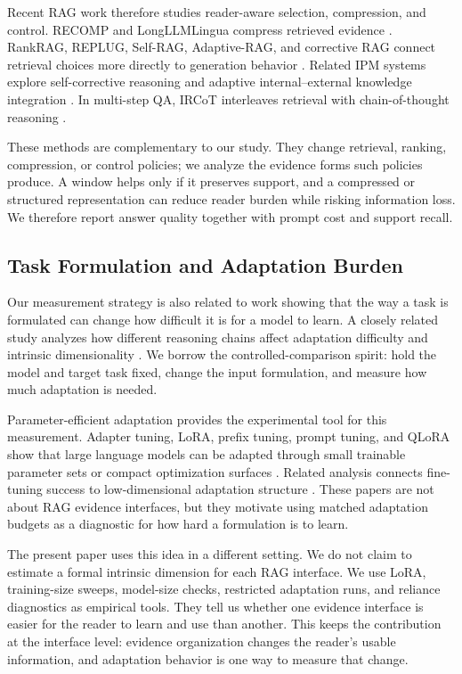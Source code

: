 \documentclass[a4paper,fleqn]{cas-sc}
\begin{document}
Recent RAG work therefore studies reader-aware selection, compression, and
control. RECOMP and LongLLMLingua compress retrieved evidence
\citep{xu2023recomp,jiang2023longllmlingua}. RankRAG, REPLUG, Self-RAG,
Adaptive-RAG, and corrective RAG connect retrieval choices more directly to
generation behavior \citep{yu2024rankrag,shi2024replug,asai2023selfrag,jeong2024adaptiverag,yan2024crag}.
Related IPM systems explore self-corrective reasoning and adaptive
internal--external knowledge integration \citep{li2026scrag,zhou2026inker}.
In multi-step QA, IRCoT interleaves retrieval with chain-of-thought reasoning
\citep{trivedi2023ircot}.

These methods are complementary to our study. They change retrieval, ranking,
compression, or control policies; we analyze the evidence forms such policies
produce. A window helps only if it preserves support, and a compressed or
structured representation can reduce reader burden while risking information
loss. We therefore report answer quality together with prompt cost and support
recall.

\subsection{Task Formulation and Adaptation Burden}

Our measurement strategy is also related to work showing that the way a task is
formulated can change how difficult it is for a model to learn. A closely
related study analyzes how different reasoning chains affect adaptation
difficulty and intrinsic dimensionality
\citep{prasad2026reasoningchains}. We borrow the controlled-comparison spirit:
hold the model and target task fixed, change the input formulation, and measure
how much adaptation is needed.

Parameter-efficient adaptation provides the experimental tool for this
measurement. Adapter tuning, LoRA, prefix tuning, prompt tuning, and QLoRA show
that large language models can be adapted through small trainable parameter
sets or compact optimization surfaces
\citep{houlsby2019adapters,hu2022lora,li2021prefixtuning,lester2021prompttuning,dettmers2023qlora}.
Related analysis connects fine-tuning success to low-dimensional adaptation
structure \citep{aghajanyan2021intrinsic}. These papers are not about RAG
evidence interfaces, but they motivate using matched adaptation budgets as a
diagnostic for how hard a formulation is to learn.

The present paper uses this idea in a different setting. We do not claim to
estimate a formal intrinsic dimension for each RAG interface. We use LoRA,
training-size sweeps, model-size checks, restricted adaptation runs, and
reliance diagnostics as empirical tools. They tell us whether one evidence
interface is easier for the reader to learn and use than another. This keeps
the contribution at the interface level: evidence organization changes the
reader's usable information, and adaptation behavior is one way to measure that
change.
\end{document}
